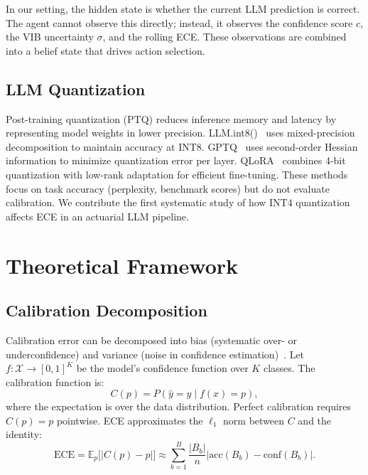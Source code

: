 \documentclass[conference]{IEEEtran}
\begin{document}
In our setting, the hidden state is whether the current LLM prediction
is correct. The agent cannot observe this directly; instead, it
observes the confidence score $c$, the VIB uncertainty $\sigma$, and
the rolling ECE. These observations are combined into a belief state
that drives action selection.

\subsection{LLM Quantization}

Post-training quantization (PTQ) reduces inference memory and
latency by representing model weights in lower precision. LLM.int8()~\cite{dettmers2022llmint8}
uses mixed-precision decomposition to maintain accuracy at INT8.
GPTQ~\cite{frantar2022gptq} uses second-order Hessian information
to minimize quantization error per layer. QLoRA~\cite{dettmers2023qlora}
combines 4-bit quantization with low-rank adaptation for efficient
fine-tuning. These methods focus on task accuracy (perplexity,
benchmark scores) but do not evaluate calibration. We contribute the
first systematic study of how INT4 quantization affects ECE in an
actuarial LLM pipeline.

\section{Theoretical Framework}
\label{sec:theory}

\subsection{Calibration Decomposition}

Calibration error can be decomposed into bias (systematic over- or
underconfidence) and variance (noise in confidence estimation)~\cite{vaicenavicius2019evaluating}.
Let $f:\mathcal{X}\to[0,1]^K$ be the model's confidence function over
$K$ classes. The calibration function is:
\begin{equation}
    C(p) = P\!\left(\hat{y}=y \mid f(x)=p\right),
\end{equation}
where the expectation is over the data distribution. Perfect
calibration requires $C(p)=p$ pointwise. ECE approximates the
$\ell_1$ norm between $C$ and the identity:
\begin{equation}
    \text{ECE} = \mathbb{E}_p\bigl[|C(p)-p|\bigr]
    \approx \sum_{b=1}^{B}\frac{|B_b|}{n}|\mathrm{acc}(B_b)-\mathrm{conf}(B_b)|.
    \label{eq:ece_formal}
\end{equation}
\end{document}
